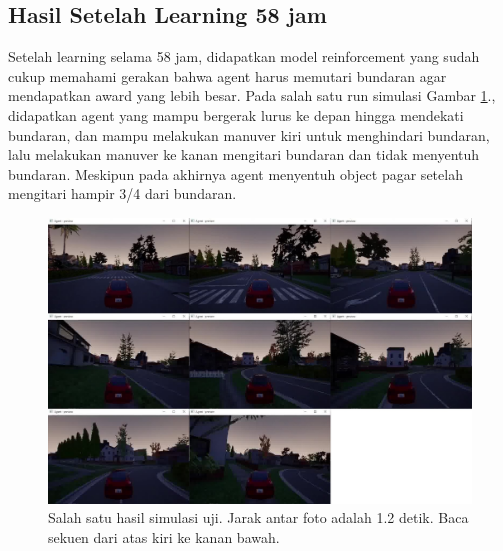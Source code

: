 \subsection{Hasil Setelah Learning 58 jam}
\label{sec:hasil_learning_12}
Setelah learning selama 58 jam, didapatkan model reinforcement yang sudah cukup memahami gerakan bahwa agent harus memutari bundaran agar mendapatkan award yang lebih besar. Pada salah satu run simulasi Gambar \ref{fig:uji1}., didapatkan agent yang mampu bergerak lurus ke depan hingga mendekati bundaran, dan mampu melakukan manuver kiri untuk menghindari bundaran, lalu melakukan manuver ke kanan mengitari bundaran dan tidak menyentuh bundaran. Meskipun pada akhirnya agent menyentuh object pagar setelah mengitari hampir 3/4 dari bundaran.
\begin{figure}[H] 
	\centering
	\includegraphics[width=1\linewidth]{images/uji1}
	\caption{Salah satu hasil simulasi uji. Jarak antar foto adalah 1.2 detik. Baca sekuen dari atas kiri ke kanan bawah.}
	\label{fig:uji1}
\end{figure}
\fi
